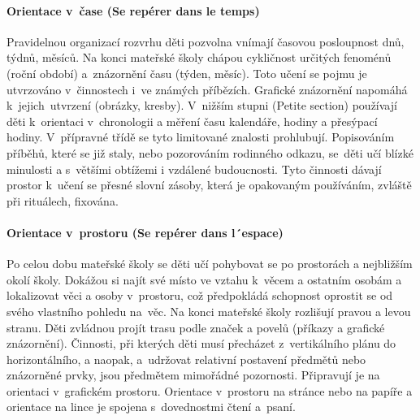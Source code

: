 			\paragraph{Orientace v čase (Se repérer dans le temps)}
				Pravidelnou organizací rozvrhu děti pozvolna vnímají časovou posloupnost dnů, týdnů, měsíců. Na konci mateřské školy chápou cykličnost určitých fenoménů (roční období) a znázornění času (týden, měsíc). Toto učení se pojmu je utvrzováno v činnostech i ve známých příbězích. Grafické znázornění napomáhá k~jejich utvrzení (obrázky, kresby).
				V nižším stupni (Petite section) používají děti k orientaci v chronologii a měření času kalendáře, hodiny a přesýpací hodiny. V přípravné třídě se tyto limitované znalosti prohlubují. Popisováním příběhů, které se již staly, nebo pozorováním rodinného odkazu, se děti učí blízké minulosti a s většími obtížemi i vzdálené budoucnosti.
				Tyto činnosti dávají prostor k učení se přesné slovní zásoby, která je opakovaným používáním, zvláště při rituálech, fixována.
			\paragraph{Orientace v prostoru (Se repérer dans l´espace)}
				Po celou dobu mateřské školy se děti učí pohybovat se po prostorách a nejbližším okolí školy. Dokážou si najít své místo ve vztahu k věcem a ostatním osobám a lokalizovat věci a osoby v~prostoru, což předpokládá schopnost oprostit se od svého vlastního pohledu na věc. Na konci mateřské školy rozlišují pravou a levou stranu. Děti zvládnou projít trasu podle značek a povelů (příkazy a grafické znázornění).
				Činnosti, při kterých děti musí přecházet z vertikálního plánu do horizontálního, a naopak, a udržovat relativní postavení předmětů nebo znázorněné prvky, jsou předmětem mimořádné pozornosti. Připravují je na orientaci v grafickém prostoru. Orientace v prostoru na stránce nebo na papíře a orientace na lince je spojena s dovednostmi čtení a psaní. 
